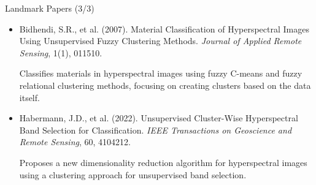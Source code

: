 \documentclass[10pt,svgnames,fragile]{beamer}
\begin{document}
\begin{frame}{Landmark Papers (3/3)}
\footnotesize
\begin{itemize}
    \item Bidhendi, S.R., et al. (2007). Material Classification of Hyperspectral Images Using Unsupervised Fuzzy Clustering Methods. \textit{Journal of Applied Remote Sensing}, 1(1), 011510. \href{https://consensus.app/papers/classification-hyperspectral-images-using-unsupervised-bidhendi/ac0b5a2ecb8958599373f4d51686fba2/?utm_source=chatgpt}{\color{blue}{DOI: 10.1117/1.2794359}}

    {\color{gray}Classifies materials in hyperspectral images using fuzzy C-means and fuzzy relational clustering methods, focusing on creating clusters based on the data itself.}

    \item Habermann, J.D., et al. (2022). Unsupervised Cluster-Wise Hyperspectral Band Selection for Classification. \textit{IEEE Transactions on Geoscience and Remote Sensing}, 60, 4104212. \href{https://consensus.app/papers/unsupervised-clusterwise-hyperspectral-band-selection-habermann/6429aafba4da503c91677e9a15644ff8/?utm_source=chatgpt}{\color{blue}{DOI: 10.1109/TGRS.2021.3137020}}

    {\color{gray}Proposes a new dimensionality reduction algorithm for hyperspectral images using a clustering approach for unsupervised band selection.}
\end{itemize}
\end{frame}
\end{document}
